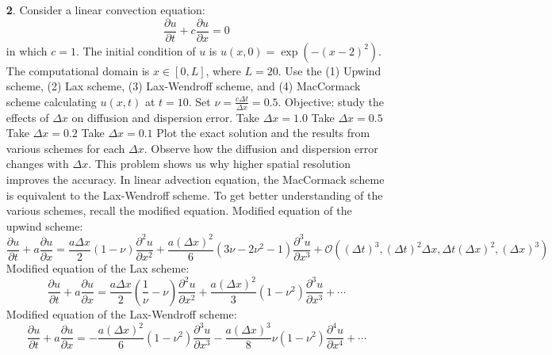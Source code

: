 \documentclass{article}
\begin{document}
\begin{itemize}
    \pagebreak
    \item[\textbf{2}.] Consider a linear convection equation:
    \[\frac{\partial u}{\partial t} + c\frac{\partial u}{\partial x} = 0\]
    in which $c = 1$. The initial condition of $u$ is $u(x,0) = \exp{(-(x - 2)^2)}.$ The computational domain is $x \in [0,L]$, where $L = 20$. Use the (1) Upwind scheme, (2) Lax scheme, (3) Lax-Wendroff scheme, and (4) MacCormack scheme calculating $u(x,t)$ at $t = 10$. Set $\nu = \frac{c\Delta t}{\Delta x} = 0.5$.
    \newline\newline
    Objective: study the effects of $\Delta x$ on diffusion and dispersion error.
     Take $\Delta x = 1.0$
     Take $\Delta x = 0.5$
     Take $\Delta x = 0.2$
     Take $\Delta x = 0.1$
    \newline\newline
    Plot the exact solution and the results from various schemes for each $\Delta x$. Observe how the diffusion and dispersion error changes with $\Delta x$. This problem shows us why higher spatial resolution improves the accuracy. In linear advection equation, the MacCormack scheme is equivalent to the Lax-Wendroff scheme.
    \newline\newline
    To get better understanding of the various schemes, recall the modified equation.
    \newline\newline
    Modified equation of the upwind scheme:
    \[\frac{\partial u}{\partial t} + a\frac{\partial u}{\partial x} = \frac{a\Delta x}{2}(1 - \nu)\frac{\partial^2u}{\partial x^2} + \frac{a(\Delta x)^2}{6}(3\nu - 2\nu^2 - 1)\frac{\partial^3u}{\partial x^3} + \mathcal{O}((\Delta t)^3, (\Delta t)^2\Delta x, \Delta t(\Delta x)^2, (\Delta x)^3)\]
    Modified equation of the Lax scheme:
    \[\frac{\partial u}{\partial t} + a\frac{\partial u}{\partial x} = \frac{a\Delta x}{2}\left(\frac{1}{\nu} - \nu\right)\frac{\partial^2u}{\partial x^2} + \frac{a(\Delta x)^2}{3}(1 - \nu^2)\frac{\partial^3u}{\partial x^3} + \cdots\]
    Modified equation of the Lax-Wendroff scheme:
    \[\frac{\partial u}{\partial t} + a\frac{\partial u}{\partial x} = -\frac{a(\Delta x)^2}{6}(1 - \nu^2)\frac{\partial^3u}{\partial x^3} - \frac{a(\Delta x)^3}{8}\nu(1 - \nu^2)\frac{\partial^4u}{\partial x^4} + \cdots\]

\end{itemize}
\end{document}
